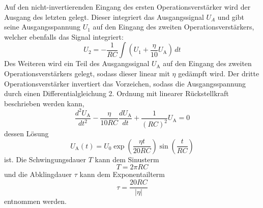 Auf den nicht-invertierenden Eingang des ersten Operationsverstärker wird der
Ausgang des letzten gelegt.
Dieser integriert das Ausgangssignal $U_A$ und gibt seine Ausgangsspannung $U_1$ auf
den Eingang des zweiten Operationsverstärkers, welcher ebenfalls das Signal
integriert:
\begin{equation}
		\label{eq:ov2}
		U_2 = - \frac{1}{RC} \int \left( U_1 + \frac{\eta}{10} U_\text{A} \right) \, dt
\end{equation}
Des Weiteren wird ein Teil des Ausgangssignal $U_\text{A}$ auf den Eingang des
zweiten Operationsverstärkers gelegt, sodass dieser linear mit $\eta$ gedämpft wird.
Der dritte Operationsverstärker invertiert das Vorzeichen, sodass die
Ausgangsspannung durch einen Differentialgleichung 2. Ordnung mit linearer
Rückstellkraft beschrieben werden kann,
\begin{equation}
		\label{eq:schwingung_diff}
		\frac{d^2 U_\text{A}}{dt^2} - \frac{\eta}{10 R C} \frac{d
		U_\text{A}}{dt} + \frac{1}{(RC)^2} U_\text{A} = 0
\end{equation}
dessen Lösung
\begin{equation}
		U_\text{A}(t) = U_0 \exp \left( \frac{\eta t}{20 RC} \right)
    \sin \left(\frac{t}{RC}\right) \label{eq:tau}
\end{equation}
ist.
Die Schwingungsdauer $T$ kann dem Sinusterm
\begin{equation}
	T = 2 \pi R C	
\end{equation}
und die Abklingdauer $\tau$ kann dem
Exponentailterm
\begin{equation}
		\tau = \frac{20 R C}{|\eta|}
\end{equation}
entnommen werden.
